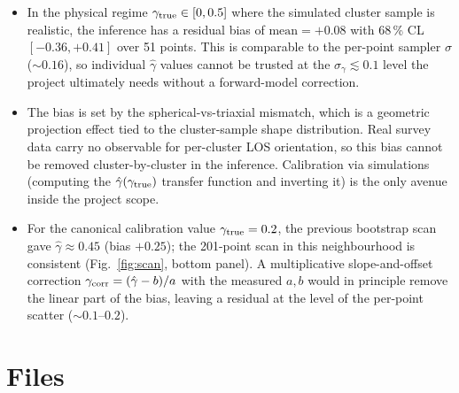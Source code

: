 \documentclass[11pt,a4paper]{article}
\newcommand{\gtrue}{\gamma_{\rm true}}
\newcommand{\ghat}{\hat\gamma}
\begin{document}
\begin{itemize}
\item In the physical regime $\gtrue\in[0,0.5]$ where the simulated cluster
      sample is realistic, the inference has a residual bias of
      $\mathrm{mean}=+0.08$ with 68\,\% CL $[-0.36,+0.41]$ over 51 points.
      This is comparable to the per-point sampler $\sigma$ ($\sim 0.16$),
      so individual $\ghat$ values cannot be trusted at the
      $\sigma_\gamma \lesssim 0.1$ level the project ultimately needs without
      a forward-model correction.

\item The bias is set by the spherical-vs-triaxial mismatch, which is a
      geometric projection effect tied to the cluster-sample shape
      distribution.  Real survey data carry no observable for per-cluster
      LOS orientation, so this bias cannot be removed cluster-by-cluster
      in the inference.  Calibration via simulations (computing the
      $\ghat(\gtrue)$ transfer function and inverting it) is the only
      avenue inside the project scope.

\item For the canonical calibration value $\gtrue=0.2$, the previous
      bootstrap scan gave $\ghat\approx 0.45$ (bias $+0.25$); the
      201-point scan in this neighbourhood is consistent
      (Fig.~\ref{fig:scan}, bottom panel).  A multiplicative slope-and-offset
      correction $\gamma_{\rm corr} = (\ghat - b)/a$ with the measured
      $a,b$ would in principle remove the linear part of the bias, leaving
      a residual at the level of the per-point scatter ($\sim 0.1$--$0.2$).
\end{itemize}

\section*{Files}
\end{document}
